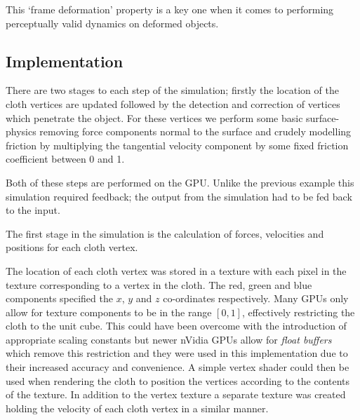 This `frame deformation' property is a key one when it comes to performing perceptually
valid dynamics on deformed objects.


\subsection{Implementation}

There are two stages to each step of the simulation; firstly the location of
the cloth vertices are updated followed by the detection and correction of
vertices which penetrate the object. For these vertices we perform some basic
surface-physics removing force components normal to the surface and crudely
modelling friction by multiplying the tangential velocity component by some
fixed friction coefficient between 0 and 1.

Both of these steps are performed on the GPU. Unlike the previous example this
simulation required feedback; the output from the simulation had to be fed back
to the input.


The first stage in the simulation is the calculation of forces, velocities
and positions for each cloth vertex. 

The location of each cloth vertex was stored in a texture with each pixel in the
texture corresponding to a vertex in the cloth. The red, green and blue
components specified the $x$, $y$ and $z$ co-ordinates respectively.  Many GPUs
only allow for texture components to be in the range $[0, 1]$, effectively
restricting the cloth to the unit cube. This could have been overcome with the
introduction of appropriate scaling constants but newer nVidia GPUs allow for
\emph{float buffers} which remove this restriction and they were used in this
implementation due to their increased accuracy and convenience. A simple vertex shader
could then be used when rendering the cloth to position the vertices according to the
contents of the texture.
In addition to the vertex texture a separate texture was created holding the 
velocity of each cloth vertex in a similar manner. 


